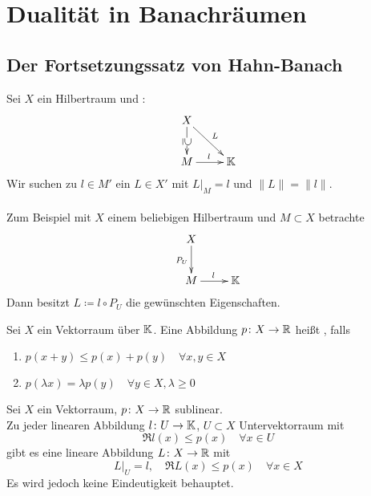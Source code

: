 

\chapter*{Dualität in Banachräumen}  \setcounter{section}{19}



\section{Der Fortsetzungssatz von Hahn-Banach}



\begin{motivation}
	Sei $X$ ein Hilbertraum und {}: {}
	\[ \begin{xy} \xymatrix{  
			X \ar[rd]^L \ar[d]|{ \rotatebox[origin=c]{270}{$\supseteq$}  }          \\
      		M \ar[r]^l    				  &   \MdK			
		} \end{xy} \]
	Wir suchen zu $l \in M'$ ein $L \in X'$ mit $L|_{M} = l$ und $\| L \| = \| l \|$. \\ \\
 	Zum Beispiel mit $X$ einem beliebigen Hilbertraum und $M \subset X$ betrachte
 		\[ \begin{xy} \xymatrix{
			X \ar[d]_{ P_{U} }                      \\
      		M \ar[r]^l    				   &   \MdK			
		} \end{xy} \]
		Dann besitzt $L \coloneqq l \circ P_{U}$ die gewünschten Eigenschaften.
\end{motivation}
 
 
\begin{definition}
	Sei $X$ ein Vektorraum über $\mathbb{K}$. Eine Abbildung $p \colon X \rightarrow \mathbb{R}$ hei{\ss}t , falls
 	\begin{enumerate}[label=\alph*\upshape)]
 		\item $p( x + y) \leq p(x) + p(y) \quad \forall x, y \in X$
 		\item $p(\lambda x ) = \lambda p(y) \quad \forall y \in X, \lambda \geq 0$
 	\end{enumerate}
\end{definition}


\begin{satz} \label{satz:20.2-Hahn-Banach}  \label{satz:20.2-HahnBanach}
		Sei $X$ ein Vektorraum, $p \colon X \rightarrow \mathbb{R}$ sublinear. \\
		Zu jeder linearen Abbildung $l \colon U \rightarrow \mathbb{K}$, $U \subset X$ Untervektorraum mit
			\[ \Re l(x) \leq p(x) \quad \forall x \in U \]
		gibt es eine lineare Abbildung $L \colon X \rightarrow \mathbb{R}$ mit 
			\[ L|_{U} = l, \quad \Re  L(x) \leq p(x) \quad \forall x \in X \]
		Es wird jedoch keine Eindeutigkeit behauptet.
\end{satz}

